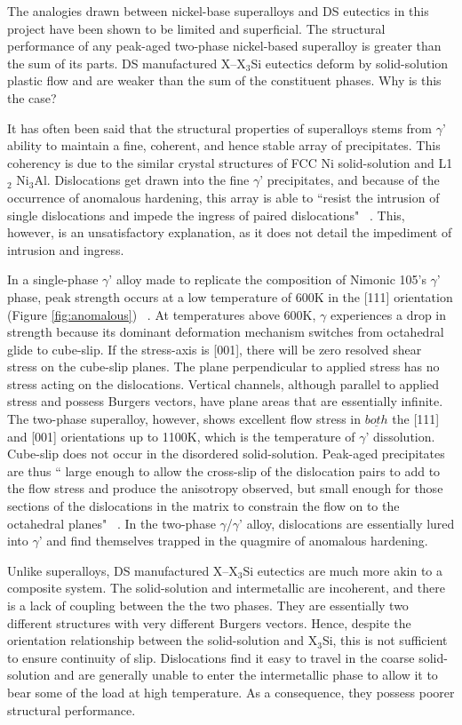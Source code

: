 The analogies drawn between nickel-base superalloys and DS eutectics in this project have been shown to be limited and superficial.  The structural performance of any peak-aged two-phase nickel-based superalloy is greater than the sum of its parts.  DS manufactured X--X$_3$Si eutectics deform by solid-solution plastic flow and are weaker than the sum of the constituent phases.  Why is this the case?

It has often been said that the structural properties of superalloys stems from $\gamma$' ability to maintain a fine, coherent, and hence stable array of precipitates.  This coherency is due to the similar crystal structures of FCC Ni solid-solution and L1$_2$ Ni$_3$Al.  Dislocations get drawn into the fine $\gamma$' precipitates, and because of the occurrence of anomalous hardening, this array is able to ``resist the intrusion of single dislocations and impede the ingress of paired dislocations" ~\cite{cathie12}.  This, however, is an unsatisfactory explanation, as it does not detail the impediment of intrusion and ingress.  

In a single-phase $\gamma$' alloy made to replicate the composition of Nimonic 105's $\gamma$' phase, peak strength occurs at a low temperature of 600K in the [111] orientation (Figure \ref{fig:anomalous}) ~\cite{nembach00}.  At temperatures above 600K, $\gamma$ experiences a drop in strength because its dominant deformation mechanism switches from octahedral glide to cube-slip.  If the stress-axis is [001], there will be zero resolved shear stress on the cube-slip planes.  The plane perpendicular to applied stress has no stress acting on the dislocations.  Vertical channels, although parallel to applied stress and possess Burgers vectors, have plane areas that are essentially infinite.  The two-phase superalloy, however, shows excellent flow stress in $\underline{both}$ the [111] and [001] orientations up to 1100K, which is the temperature of $\gamma$' dissolution.  Cube-slip does not occur in the disordered solid-solution.  Peak-aged precipitates are thus `` large enough to allow the cross-slip of the dislocation pairs to add to the flow stress and produce the anisotropy observed, but small enough for those sections of the dislocations in the matrix to constrain the flow on to the octahedral planes" ~\cite{cathie12}.  In the two-phase $\gamma$/$\gamma$' alloy, dislocations are essentially  lured into $\gamma$' and find themselves trapped in the quagmire of anomalous hardening.

Unlike superalloys, DS manufactured X--X$_3$Si eutectics are much more akin to a composite system.  The solid-solution and intermetallic are incoherent, and there is a lack of coupling between the the two phases.  They are essentially two different structures with very different Burgers vectors.  Hence, despite the orientation relationship between the solid-solution and X$_3$Si, this is not sufficient to ensure continuity of slip.  Dislocations find it easy to travel in the coarse solid-solution and are generally unable to enter the intermetallic phase to allow it to bear some of the load at high temperature.  As a consequence, they possess poorer structural performance. 

